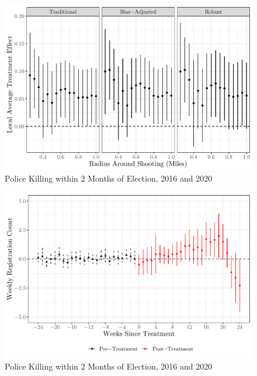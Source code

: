 \documentclass[
  12pt,
]{article}
\begin{document}
\begin{figure}[h]

{\centering \includegraphics{shoot_to_files/figure-latex/placebo-prior-1} 

}

\caption{\label{fig:map}Police Killing within 2 Months of Election, 2016 and 2020}\label{fig:placebo-prior}
\end{figure}

\begin{figure}[h]

{\centering \includegraphics{shoot_to_files/figure-latex/did-length-1} 

}

\caption{\label{fig:map}Police Killing within 2 Months of Election, 2016 and 2020}\label{fig:did-length}
\end{figure}
\end{document}
